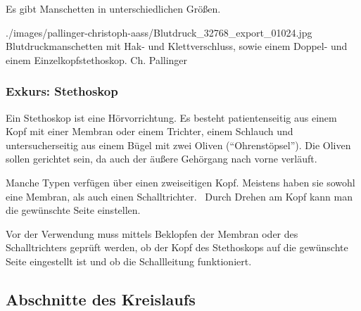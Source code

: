 {{Es gibt Manschetten in unterschiedlichen Größen.
}
{}
{}
{}
{}

{}
{}
{./images/pallinger-christoph-aass/Blutdruck_32768_export_01024.jpg}
{Blutdruckmanschetten mit Hak- und Klettverschluss, sowie
einem Doppel- und einem Einzelkopfstethoskop.}
{Ch. Pallinger}

\subsubsection{Exkurs: Stethoskop}
\label{topic:stethoskop}

{Ein Stethoskop ist eine Hörvorrichtung. Es besteht
patientenseitig aus einem Kopf mit einer Membran oder einem
Trichter, einem Schlauch und untersucherseitig aus einem
Bügel mit zwei Oliven (\protect\enquote{Ohrenstöpsel}).
Die Oliven sollen  gerichtet sein, da auch der
äußere Gehörgang nach vorne verläuft.
}{}{}{}{}

{%
Manche Typen verfügen über einen zweiseitigen Kopf. Meistens
haben sie sowohl eine Membran, als auch einen
Schalltrichter.~ Durch Drehen am Kopf kann man die gewünschte Seite
einstellen.
}{}{}{}{}

{%
Vor der Verwendung muss mittels Beklopfen der Membran oder
des Schalltrichters geprüft werden, ob der Kopf des
Stethoskops auf die gewünschte Seite eingestellt ist und ob
die Schallleitung funktioniert.

}{}{}{}{}
}

\subsection{Abschnitte des Kreislaufs}


